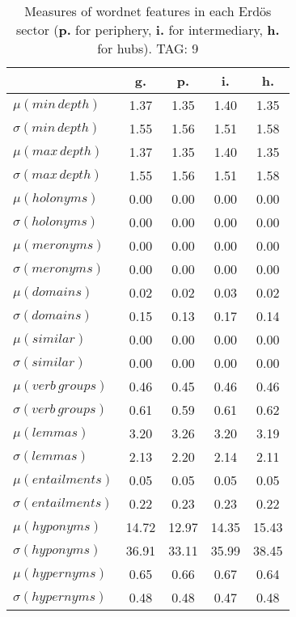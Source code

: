 \begin{table}[h!]
\begin{center}
\begin{tabular}{| l || c | c | c | c |}\hline
 & {\bf g.} & {\bf p.} & {\bf i.} & {\bf h.} \\\hline\hline
$\mu(min\,depth)$ & 1.37  & 1.35  & 1.40  & 1.35 \\
$\sigma(min\,depth)$ & 1.55  & 1.56  & 1.51  & 1.58 \\\hline
$\mu(max\,depth)$ & 1.37  & 1.35  & 1.40  & 1.35 \\
$\sigma(max\,depth)$ & 1.55  & 1.56  & 1.51  & 1.58 \\\hline
$\mu(holonyms)$ & 0.00  & 0.00  & 0.00  & 0.00 \\
$\sigma(holonyms)$ & 0.00  & 0.00  & 0.00  & 0.00 \\\hline
$\mu(meronyms)$ & 0.00  & 0.00  & 0.00  & 0.00 \\
$\sigma(meronyms)$ & 0.00  & 0.00  & 0.00  & 0.00 \\\hline
$\mu(domains)$ & 0.02  & 0.02  & 0.03  & 0.02 \\
$\sigma(domains)$ & 0.15  & 0.13  & 0.17  & 0.14 \\\hline
$\mu(similar)$ & 0.00  & 0.00  & 0.00  & 0.00 \\
$\sigma(similar)$ & 0.00  & 0.00  & 0.00  & 0.00 \\\hline
$\mu(verb\,groups)$ & 0.46  & 0.45  & 0.46  & 0.46 \\
$\sigma(verb\,groups)$ & 0.61  & 0.59  & 0.61  & 0.62 \\\hline
$\mu(lemmas)$ & 3.20  & 3.26  & 3.20  & 3.19 \\
$\sigma(lemmas)$ & 2.13  & 2.20  & 2.14  & 2.11 \\\hline
$\mu(entailments)$ & 0.05  & 0.05  & 0.05  & 0.05 \\
$\sigma(entailments)$ & 0.22  & 0.23  & 0.23  & 0.22 \\\hline
$\mu(hyponyms)$ & 14.72  & 12.97  & 14.35  & 15.43 \\
$\sigma(hyponyms)$ & 36.91  & 33.11  & 35.99  & 38.45 \\\hline
$\mu(hypernyms)$ & 0.65  & 0.66  & 0.67  & 0.64 \\
$\sigma(hypernyms)$ & 0.48  & 0.48  & 0.47  & 0.48 \\\hline
\end{tabular}
\caption{Measures of wordnet features in each Erd\"os sector ({{\bf p.}} for periphery, {{\bf i.}} for intermediary, {{\bf h.}} for hubs). TAG: 9}
\end{center}
\end{table}